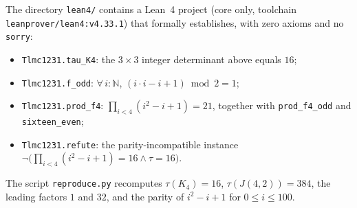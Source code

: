 \documentclass[11pt]{article}
\theoremstyle{definition}
\begin{document}
The directory \texttt{lean4/} contains a Lean~4 project (core only, toolchain
\texttt{leanprover/lean4:v4.33.1}) that formally establishes, with zero axioms and no
\texttt{sorry}:
\begin{itemize}
\item \texttt{Tlmc1231.tau\_K4}: the $3\times3$ integer determinant above equals $16$;
\item \texttt{Tlmc1231.f\_odd}: $\forall\, i : \mathbb{N}$, $(i\cdot i - i + 1) \bmod 2 = 1$;
\item \texttt{Tlmc1231.prod\_f4}: $\prod_{i<4}(i^2-i+1) = 21$, together with
      \texttt{prod\_f4\_odd} and \texttt{sixteen\_even};
\item \texttt{Tlmc1231.refute}: the parity-incompatible instance
      $\neg\bigl(\prod_{i<4}(i^2-i+1) = 16 \wedge \tau = 16\bigr)$.
\end{itemize}
The script \texttt{reproduce.py} recomputes $\tau(K_4)=16$, $\tau(J(4,2))=384$, the
leading factors $1$ and $32$, and the parity of $i^2-i+1$ for $0 \le i \le 100$.
\end{document}
